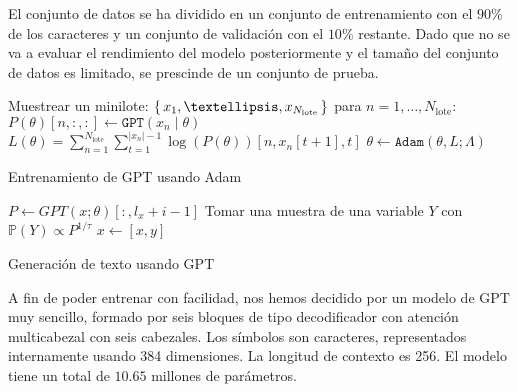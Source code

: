 El conjunto de datos se ha dividido en un conjunto de entrenamiento con el \( 90\% \) de los caracteres y un conjunto de validación con el \( 10\% \) restante. Dado que no se va a evaluar el rendimiento del modelo posteriormente y el tamaño del conjunto de datos es limitado, se prescinde de un conjunto de prueba.

\begin{algorithm}[tb]
  \SetAlgoLined

   {
    Muestrear un minilote: $\Set{x_{1}, …, x_{N_\text{lote}}}$ \;
    para $n = 1, …, N_\text{lote}$: $P(\theta)[n, :, :] \gets \texttt{GPT}(x_n \mid \theta)$ \;
    $L(\theta) = \sum_{n = 1}^{N_\text{lote}} \sum_{t = 1}^{|x_n| - 1} \log(P(\theta))[n, x_n[t + 1], t]$ \;
    $\theta \gets \texttt{Adam}(\theta, L; \Lambda)$ \;
  }
  \Return{$\theta$}

  \caption{Entrenamiento de GPT usando Adam}
  \label{algo:gpt_train}
\end{algorithm}

\begin{algorithm}[tb]
  \SetAlgoLined

   {
    $P \gets GPT(x; \theta)[:, l_x + i - 1]$ \;
    Tomar una muestra de una variable $Y$ con $\mathbb{P}(Y) \propto P^{1 / \tau}$ \;
    $x \gets [x, y]$ \;
  }

  \caption{Generación de texto usando GPT}
  \label{algo:gpt_inference}
\end{algorithm}

A fin de poder entrenar con facilidad, nos hemos decidido por un modelo de GPT muy sencillo, formado por seis bloques de tipo decodificador con atención multicabezal con seis cabezales. Los símbolos son caracteres, representados internamente usando 384 dimensiones. La longitud de contexto es 256. El modelo tiene un total de \( 10.65 \) millones de parámetros.

